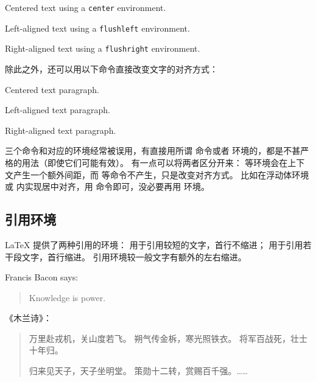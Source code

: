 \begin{example}
\begin{center}
Centered text using a
\verb|center| environment.
\end{center}
\begin{flushleft}
Left-aligned text using a
\verb|flushleft| environment.
\end{flushleft}
\begin{flushright}
Right-aligned text using a
\verb|flushright| environment.
\end{flushright}
\end{example}

除此之外，还可以用以下命令直接改变文字的对齐方式：
\begin{command}
 \quad
{} \quad
{}
\end{command}

\begin{example}
\centering
Centered text paragraph.

\raggedright
Left-aligned text paragraph.

\raggedleft
Right-aligned text paragraph.
\end{example}

三个命令和对应的环境经常被误用，有直接用所谓  命令或者  环境的，都是不甚严格的用法（即使它们可能有效）。
有一点可以将两者区分开来： 等环境会在上下文产生一个额外间距，而  等命令不产生，只是改变对齐方式。
比如在浮动体环境  或  内实现居中对齐，用  命令即可，没必要再用  环境。

\subsection{引用环境}\label{subsec:quote}

\LaTeX{} 提供了两种引用的环境： 用于引用较短的文字，首行不缩进； 用于引用若干段文字，首行缩进。
引用环境较一般文字有额外的左右缩进。
\begin{example}
Francis Bacon says:
\begin{quote}
Knowledge is power.
\end{quote}
\end{example}

\begin{example}
《木兰诗》：
\begin{quotation}
万里赴戎机，关山度若飞。
朔气传金柝，寒光照铁衣。
将军百战死，壮士十年归。

归来见天子，天子坐明堂。
策勋十二转，赏赐百千强。……
\end{quotation}
\end{example}

